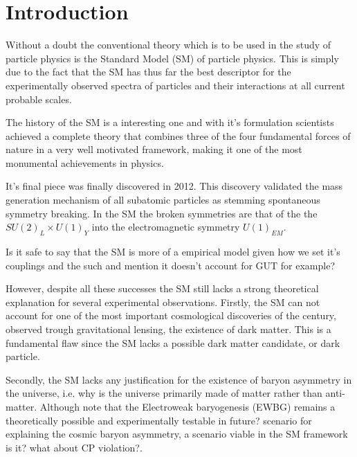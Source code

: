 
\newpage

\section{Introduction}

Without a doubt the conventional theory which is to be used in the study of particle physics is the Standard Model (SM) of particle physics. This is simply due to the fact that the SM has thus far the best descriptor for the experimentally observed spectra of particles and their interactions at all current probable scales. 

The history of the SM is a interesting one and with it's formulation scientists achieved a complete theory that combines three of the four fundamental forces of nature in a very well motivated framework, making it one of the most monumental achievements in physics. 

It's final piece was finally discovered in 2012. This discovery validated the mass generation mechanism of all subatomic particles as stemming spontaneous symmetry breaking. In the SM the broken symmetries are that of the the $SU(2)_L \times U(1)_Y$ into the electromagnetic symmetry $U(1)_{EM}$. 

{ \color{blue} Is it safe to say that the SM is more of a empirical model given how we set it's couplings and the such and mention it doesn't account for GUT for example?}

However, despite all these successes the SM still lacks a strong theoretical explanation for several experimental observations. Firstly, the SM can not account for one of the most important cosmological discoveries of the century, observed trough gravitational lensing, the existence of dark matter. This is a fundamental flaw since the SM lacks a possible dark matter candidate, or dark particle. 

Secondly, the SM lacks any justification for the existence of baryon asymmetry in the universe, i.e. why is the universe primarily made of matter rather than anti-matter. Although note that the Electroweak  baryogenesis (EWBG) remains a theoretically possible and experimentally testable {\color{blue} in future?} scenario for explaining the cosmic baryon asymmetry, a scenario viable in the SM framework {\color{blue} is it? what about CP violation?}. 

